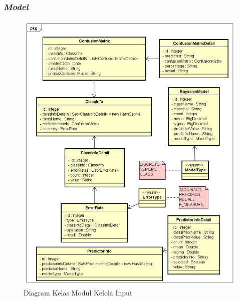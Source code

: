 \subsubsection{\textit{Model}}
\begin{figure}[H]
	\centering
	\includegraphics[scale=0.6]{ClassDiagramLengkap/Klasifikasi/Simple_CD_Klasifikasi_Model}
	\caption[Diagram Kelas Modul Kelola Input]{Diagram Kelas Modul Kelola Input}
	\label{fig:Diagram Kelas Modul Kelola Input}
\end{figure}
